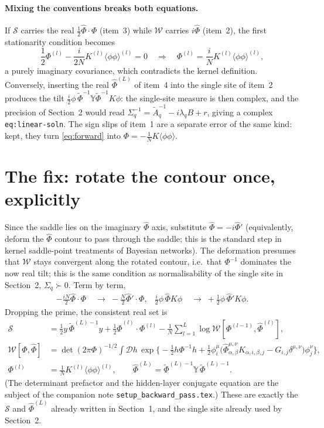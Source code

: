 \documentclass[11pt,a4paper]{article}
\newcommand{\D}{\mathcal D}
\newcommand{\W}{\mathcal W}
\newcommand{\Sact}{\mathcal S}
\newcommand{\Phit}{\tilde\Phi}
\begin{document}
\paragraph{Mixing the conventions breaks both equations.}
If $\Sact$ carries the real $\frac12\hat\Phi\cdot\Phi$ (item~3) while $\W$
carries $i\hat\Phi$ (item~2), the first stationarity condition becomes
\begin{equation}
  \frac12\Phi^{(l)} - \frac{i}{2N}K^{(l)}\langle\phi\phi\rangle^{(l)} = 0
  \quad\Longrightarrow\quad
  \Phi^{(l)} = \frac iN K^{(l)}\langle\phi\phi\rangle^{(l)},
\end{equation}
a purely imaginary covariance, which contradicts the kernel definition. Conversely,
inserting the real $\hat\Phi^{(L)}$ of item~4 into the single site of item~2
produces the tilt $\frac i2\phi\,\Phit^{-1}\mathbb Y\Phit^{-1}K\phi$: the
single-site measure is then complex, and the precision of Section~2 would read
$\Sigma_q^{-1} = \tilde A_q^{-1} - i\lambda_q B + r$, giving a complex
\texttt{eq:linear-soln}. The sign slips of item~1 are a separate error of the
same kind: kept, they turn \eqref{eq:forward} into $\Phi = -\frac1N K\langle\phi\phi\rangle$.

\section{The fix: rotate the contour once, explicitly}

Since the saddle lies on the imaginary $\hat\Phi$ axis, substitute
$\hat\Phi = -i\hat\Phi'$ (equivalently, deform the $\hat\Phi$ contour to pass
through the saddle; this is the standard step in kernel saddle-point treatments
of Bayesian networks). The deformation presumes that $\W$ stays convergent
along the rotated contour, i.e.\ that $\Phi^{-1}$ dominates the now real tilt;
this is the same condition as normalisability of the single site in Section~2,
$\Sigma_q \succ 0$. Term by term,
\begin{align}
  -\tfrac{iN}{2}\hat\Phi\cdot\Phi &\;\to\; -\tfrac N2\hat\Phi'\cdot\Phi, &
  \tfrac i2\phi\,\hat\Phi K\phi &\;\to\; +\tfrac12\phi\,\hat\Phi' K\phi .
\end{align}
Dropping the prime, the consistent real set is
\begin{align}
  \Sact &= \frac12 y\,\Phit^{(L)-1}y + \frac12\hat\Phi^{(l)}\!\cdot\Phi^{(l)}
          - \frac1N\sum_{l=1}^L\log\W[\Phi^{(l-1)},\hat\Phi^{(l)}],\\
  \W[\Phi,\hat\Phi] &= \det(2\pi\Phi)^{-1/2}\!\int\!\D h\,
     \exp\Big\{-\tfrac12 h\Phi^{-1}h
     + \tfrac12\phi^\mu_i\big(\hat\Phi^{\mu,\nu}_{\alpha,\beta}K_{\alpha,i,\beta,j}
     - G_{i,j}\delta^{\mu,\nu}\big)\phi^\nu_j\Big\},\\
  \Phi^{(l)} &= \tfrac1N K^{(l)}\langle\phi\phi\rangle^{(l)},\qquad
  \hat\Phi^{(L)} = \Phit^{(L)-1}\mathbb Y\,\Phit^{(L)-1}.
\end{align}
(The determinant prefactor and the hidden-layer conjugate equation are the
subject of the companion note \texttt{setup\_backward\_pass.tex}.)
These are exactly the $\Sact$ and $\hat\Phi^{(L)}$ already written in Section~1,
and the single site already used by Section~2.
\end{document}
